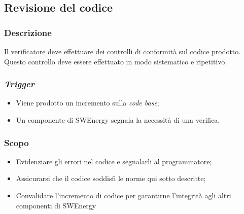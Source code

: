 \subsection{Revisione del codice}
\label{revisione-codice}

\subsubsection{Descrizione}

Il verificatore deve effettuare dei controlli di conformità sul codice
prodotto. Questo controllo deve essere effettuato in modo sistematico e
ripetitivo.

\subsubsection{\textit{Trigger}}
\begin{itemize}
	\item Viene prodotto un incremento sulla \textit{code base};

	\item Un componente di SWEnergy segnala la necessità di una verifica.
\end{itemize}

\subsubsection{Scopo}
\begin{itemize}
	\item Evidenziare gli errori nel codice e segnalarli al programmatore;

	\item Assicurarsi che il codice soddisfi le norme qui sotto descritte;

	\item Convalidare l'incremento di codice per garantirne l'integrità agli
	      altri componenti di SWEnergy
\end{itemize}

